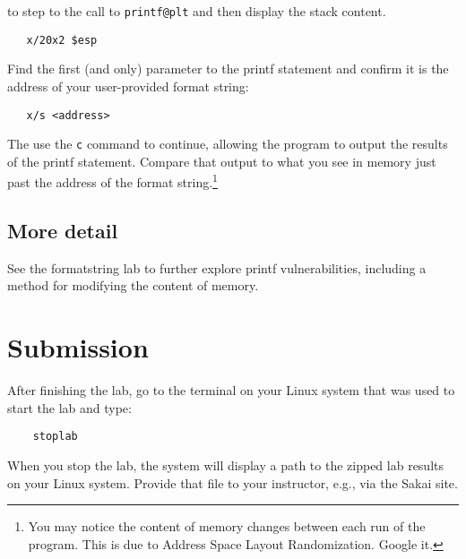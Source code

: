 \noindent to step to the call to {\tt printf@plt} and then display the stack content.
\begin{verbatim}
   x/20x2 $esp
\end{verbatim}
\noindent  Find the first (and only) parameter to the printf statement and confirm it is the address of your user-provided format string:
\begin{verbatim}
   x/s <address>
\end{verbatim}
\noindent The use the {\tt c} command to continue, allowing the program to output the results of the printf statement.
Compare that output to what you see in memory just past the address of the format string.\footnote{You may notice the content of memory
changes between each run of the program.  This is due to Address Space Layout Randomization.  Google it.}

\subsection{More detail}
See the formatstring lab to further explore printf vulnerabilities, including a method for modifying the content of memory.


\section{Submission}
After finishing the lab, go to the terminal on your Linux system that was used to start the lab and type:
\begin{verbatim}
    stoplab 
\end{verbatim}
When you stop the lab, the system will display a path to the zipped lab results on your Linux system.  Provide that file to 
your instructor, e.g., via the Sakai site.

\copyrightnotice


